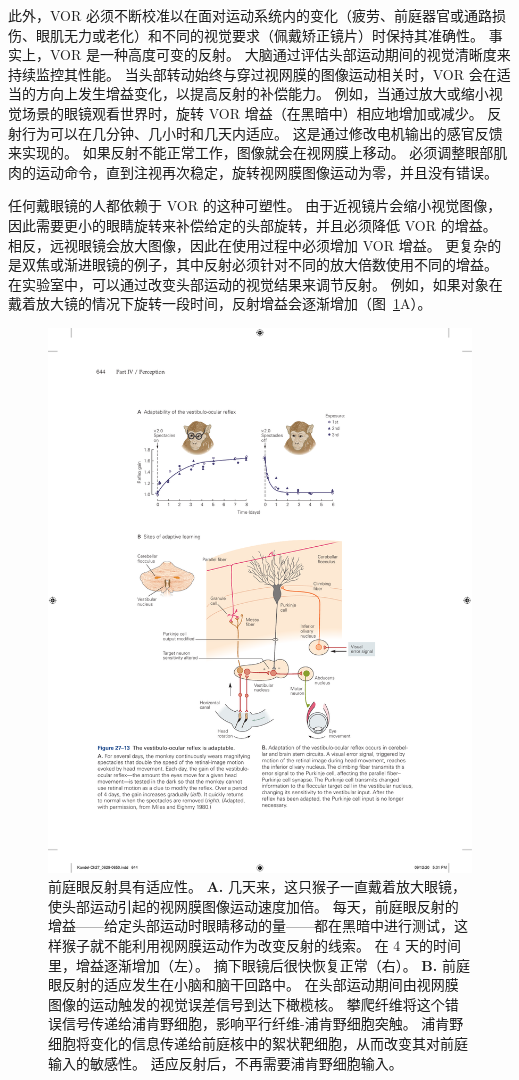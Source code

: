 此外，VOR 必须不断校准以在面对运动系统内的变化（疲劳、前庭器官或通路损伤、眼肌无力或老化）和不同的视觉要求（佩戴矫正镜片）时保持其准确性。
事实上，VOR 是一种高度可变的反射。
大脑通过评估头部运动期间的视觉清晰度来持续监控其性能。
当头部转动始终与穿过视网膜的图像运动相关时，VOR 会在适当的方向上发生增益变化，以提高反射的补偿能力。
例如，当通过放大或缩小视觉场景的眼镜观看世界时，旋转 VOR 增益（在黑暗中）相应地增加或减少。
反射行为可以在几分钟、几小时和几天内适应。 这是通过修改电机输出的感官反馈来实现的。
如果反射不能正常工作，图像就会在视网膜上移动。
必须调整眼部肌肉的运动命令，直到注视再次稳定，旋转视网膜图像运动为零，并且没有错误。


任何戴眼镜的人都依赖于 VOR 的这种可塑性。
由于近视镜片会缩小视觉图像，因此需要更小的眼睛旋转来补偿给定的头部旋转，并且必须降低 VOR 的增益。
相反，远视眼镜会放大图像，因此在使用过程中必须增加 VOR 增益。
更复杂的是双焦或渐进眼镜的例子，其中反射必须针对不同的放大倍数使用不同的增益。
在实验室中，可以通过改变头部运动的视觉结果来调节反射。 
例如，如果对象在戴着放大镜的情况下旋转一段时间，反射增益会逐渐增加（图~\ref{fig:27_13}A）。


\begin{figure}[htbp]
	\centering
	\includegraphics[width=0.75\linewidth]{chap27/fig_27_13}
	\caption{前庭眼反射具有适应性。
		\textbf{A.} 几天来，这只猴子一直戴着放大眼镜，使头部运动引起的视网膜图像运动速度加倍。
		每天，前庭眼反射的增益——给定头部运动时眼睛移动的量——都在黑暗中进行测试，这样猴子就不能利用视网膜运动作为改变反射的线索。
		在 4 天的时间里，增益逐渐增加（左）。
		摘下眼镜后很快恢复正常（右）\cite{miles1980long}。
		\textbf{B.} 前庭眼反射的适应发生在小脑和脑干回路中。
		在头部运动期间由视网膜图像的运动触发的视觉误差信号到达下橄榄核。
		攀爬纤维将这个错误信号传递给浦肯野细胞，影响平行纤维-浦肯野细胞突触。
		浦肯野细胞将变化的信息传递给前庭核中的絮状靶细胞，从而改变其对前庭输入的敏感性。
		适应反射后，不再需要浦肯野细胞输入。}
	\label{fig:27_13}
\end{figure}


